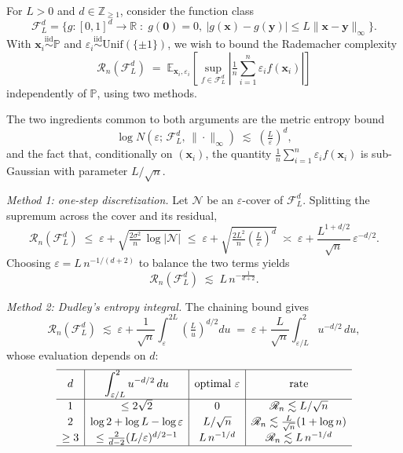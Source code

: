 \begin{exam}
For $L > 0$ and $d \in \mathbb{Z}_{\geq 1}$, consider the function class
\[
\mathcal{F}_L^d = \bigl\{g : [0,1]^d \to \mathbb{R} \;:\; g(\mathbf{0}) = 0,\ |g(\mathbf{x}) - g(\mathbf{y})| \leq L\|\mathbf{x} - \mathbf{y}\|_\infty\bigr\}.
\]
With $\mathbf{x}_i \stackrel{\mathrm{iid}}{\sim} \mathbb{P}$ and $\varepsilon_i \stackrel{\mathrm{iid}}{\sim} \mathrm{Unif}(\{\pm 1\})$, we wish to bound the Rademacher complexity
\[
\mathcal{R}_n(\mathcal{F}_L^d) \;=\; \mathbb{E}_{\mathbf{x}_i,\varepsilon_i}\!\left[\sup_{f\in\mathcal{F}_L^d}\left|\tfrac{1}{n}\sum_{i=1}^n \varepsilon_i f(\mathbf{x}_i)\right|\right]
\]
independently of $\mathbb{P}$, using two methods.

\smallskip
The two ingredients common to both arguments are the metric entropy bound
\[
\log N\!\left(\varepsilon;\,\mathcal{F}_L^d,\,\|\cdot\|_\infty\right) \;\lesssim\; \left(\tfrac{L}{\varepsilon}\right)^d,
\]
and the fact that, conditionally on $(\mathbf{x}_i)$, the quantity $\tfrac{1}{n}\sum_{i=1}^n \varepsilon_i f(\mathbf{x}_i)$ is sub-Gaussian with parameter $L/\sqrt{n}$.

\smallskip
\noindent\textit{Method 1: one-step discretization.} Let $\mathcal{N}$ be an $\varepsilon$-cover of $\mathcal{F}_L^d$. Splitting the supremum across the cover and its residual,
\[
\mathcal{R}_n(\mathcal{F}_L^d)
\;\leq\; \varepsilon + \sqrt{\tfrac{2\sigma^2}{n}\,\log|\mathcal{N}|}
\;\leq\; \varepsilon + \sqrt{\tfrac{2L^2}{n}\left(\tfrac{L}{\varepsilon}\right)^d}
\;\asymp\; \varepsilon + \frac{L^{1+d/2}}{\sqrt{n}}\,\varepsilon^{-d/2}.
\]
Choosing $\varepsilon = L\, n^{-1/(d+2)}$ to balance the two terms yields
\[
\mathcal{R}_n(\mathcal{F}_L^d) \;\lesssim\; L\,n^{-\frac{1}{d+2}}.
\]

\smallskip
\noindent\textit{Method 2: Dudley's entropy integral.} The chaining bound gives
\[
\mathcal{R}_n(\mathcal{F}_L^d)
\;\lesssim\; \varepsilon + \frac{1}{\sqrt{n}}\int_{\varepsilon}^{2L}\!\left(\tfrac{L}{u}\right)^{d/2}\!du
\;=\; \varepsilon + \frac{L}{\sqrt{n}}\int_{\varepsilon/L}^{2} u^{-d/2}\, du,
\]
whose evaluation depends on $d$:
\[
\begin{array}{c|c|c|c}
\hline
d & \displaystyle\int_{\varepsilon/L}^{2} u^{-d/2}\, du & \text{optimal } \varepsilon & \text{rate} \\
\hline
1 & \leq 2\sqrt{2} & 0 & \mathcal{R}_n \lesssim L/\sqrt{n} \\[2pt]
2 & \log 2 + \log L - \log\varepsilon & L/\sqrt{n} & \mathcal{R}_n \lesssim \tfrac{L}{\sqrt{n}}(1 + \log n) \\[2pt]
\geq 3 & \leq \tfrac{2}{d-2}(L/\varepsilon)^{d/2 - 1} & L\,n^{-1/d} & \mathcal{R}_n \lesssim L\,n^{-1/d} \\
\hline
\end{array}
\]
\end{exam}


